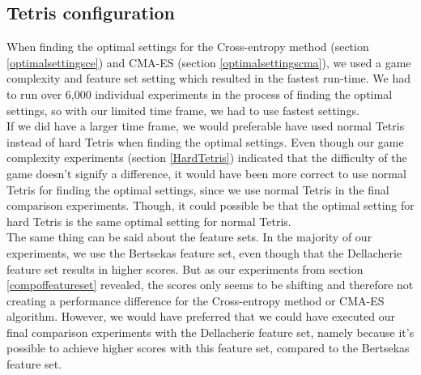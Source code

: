 \subsection{Tetris configuration}

When finding the optimal settings for the Cross-entropy method (section \ref{optimalsettingsce})
and CMA-ES (section \ref{optimalsettingscma}), we used a game complexity and feature set 
setting which resulted in the fastest run-time. We had to run over 6,000 individual experiments
in the process of finding the optimal settings, so with our limited time frame, we had
to use fastest settings.\\
If we did have a larger time frame, we would preferable have used normal Tetris instead
of hard Tetris when finding the optimal settings. Even though our game complexity experiments
(section \ref{HardTetris}) indicated that the difficulty of the game doesn't signify a difference, it would have been more correct to use normal Tetris for finding the optimal settings, since
we use normal Tetris in the final comparison experiments. Though, it could possible be that the
optimal setting for hard Tetris is the same optimal setting for normal Tetris.\\
The same thing can be said about the feature sets. In the majority of our experiments, we
use the Bertsekas feature set, even though that the Dellacherie feature set results in
higher scores. But as our experiments from section \ref{compoffeatureset} revealed, the
scores only seems to be shifting and therefore not creating a performance difference for
the Cross-entropy method or CMA-ES algorithm. However, we would have preferred that we could have
executed our final comparison experiments with the Dellacherie feature set, namely because
it's possible to achieve higher scores with this feature set, compared to the Bertsekas feature
set.